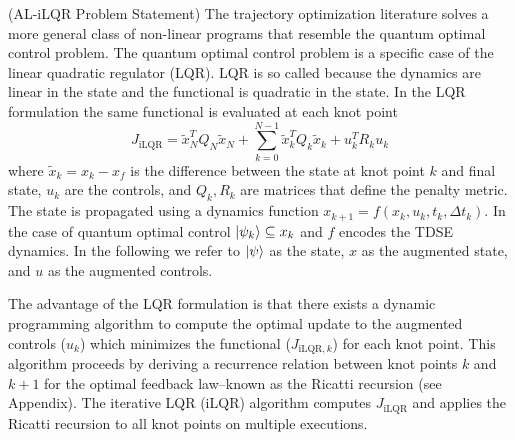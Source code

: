 \documentclass[
  amsfonts,
  amsmath,
  tbtags,
  amssymb,
  aps,
  nobibnotes,
  twocolumn,
  superscriptaddress,
]{revtex4-2}
\begin{document}
(AL-iLQR Problem Statement) The trajectory optimization
literature solves a more general class of non-linear programs that resemble
the quantum optimal control problem. The quantum optimal control
problem is a specific case of the linear quadratic regulator (LQR).
LQR is so called because the dynamics are linear in the state and
the functional is quadratic in the state. In the LQR formulation
the same functional is evaluated at each knot point
\begin{equation}
  J_{\textrm{iLQR}} = \tilde{x}_{N}^{T} Q_{N} \tilde{x}_{N}
  + \sum_{k = 0}^{N - 1} \tilde{x}_{k}^{T} Q_{k} \tilde{x}_{k} + u_{k}^{T} R_{k} u_{k}
\end{equation}
where $\tilde{x}_{k} = x_{k} - x_{f}$ is the difference between the state
at knot point $k$ and final state, $u_{k}$ are the controls,
and $Q_{k}, R_{k}$ are matrices that define the penalty metric.
The state is propagated using a dynamics function
$x_{k + 1} = f(x_{k}, u_{k}, t_{k}, \Delta t_{k})$.
In the case of quantum optimal control $\ket{\psi_{k}} \subseteq x_{k}$
and $f$ encodes the TDSE dynamics. In the following
we refer to $\ket{\psi}$ as the state, $x$ as the augmented
state, and $u$ as the augmented controls.

The advantage of the LQR formulation
is that there exists a dynamic programming algorithm to compute the
optimal update to the augmented controls ($u_{k}$) which minimizes the functional
($J_{\textrm{iLQR}, k}$) for each knot point. This algorithm proceeds by deriving a
recurrence relation between knot points $k$ and $k + 1$ for the optimal
feedback law--known as the Ricatti recursion (see Appendix). The
iterative LQR (iLQR) algorithm computes $J_{\textrm{iLQR}}$
and applies the Ricatti recursion to all knot points on multiple
executions.
\end{document}
